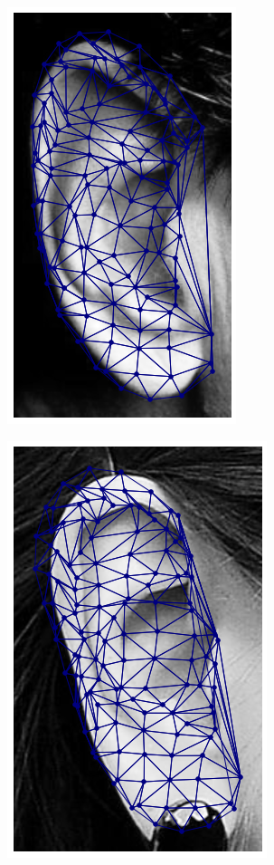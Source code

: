 \begin{figure}[!h]
\begin{subfigure}[b]{0.7\textwidth}
    \end{subfigure}
    \begin{subfigure}[b]{0.7\textwidth}
            \includegraphics[height=1\textwidth]{supports/Fittings/fitting_ear_0036}
    \end{subfigure}
    \begin{subfigure}[b]{0.7\textwidth}
            \includegraphics[height=1\textwidth]{supports/Fittings/fitting_ear_0039}

\end{subfigure}
\end{figure}
